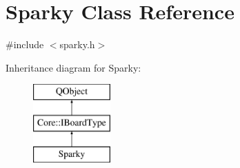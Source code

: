 \hypertarget{class_sparky}{\section{Sparky Class Reference}
\label{class_sparky}
}


{\ttfamily \#include $<$sparky.\-h$>$}

Inheritance diagram for Sparky\-:\begin{figure}[H]
\begin{center}
\leavevmode
\includegraphics[height=3.000000cm]{class_sparky}
\end{center}
\end{figure}
